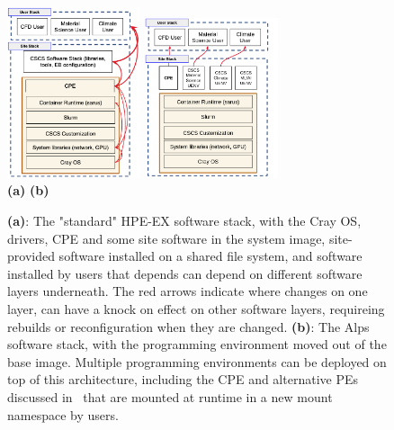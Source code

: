 \begin{figure}[htp!]
    \begin{center}
        \includegraphics[width=0.35\textwidth]{./images/stack-old.png}
        \hspace{2.5cm}
        \includegraphics[width=0.35\textwidth]{./images/stack-new.png}
        \\
        \textbf{(a)} \hspace{9cm} \textbf{(b)}\\
    \end{center}
    \caption{
        \textbf{(a)}:
        The "standard" HPE-EX software stack, with the Cray OS, drivers, CPE and some site software in the system image, site-provided software installed on a shared file system, and software installed by users that depends can depend on different software layers underneath.
        The red arrows indicate where changes on one layer, can have a knock on effect on other software layers, requireing rebuilds or reconfiguration when they are changed.\newline
        \textbf{(b)}:
        The Alps software stack, with the programming environment moved out of the base image.
        Multiple programming environments can be deployed on top of this architecture, including the CPE and alternative PEs discussed in~ that are mounted at runtime in a new mount namespace by users.
    }
    \label{fig:stacks}
\end{figure}

